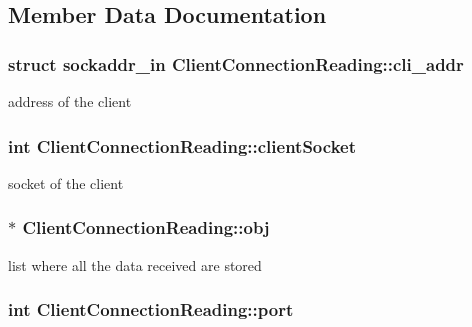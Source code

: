 \subsection{Member Data Documentation}
\hypertarget{class_client_connection_reading_a61439b4c846e3f21dd61ee25db26fdbc}{
\subsubsection[{cli\-\_\-addr}]{\setlength{\rightskip}{0pt plus 5cm}struct sockaddr\-\_\-in Client\-Connection\-Reading\-::cli\-\_\-addr\hspace{0.3cm}{\ttfamily [private]}}}\label{class_client_connection_reading_a61439b4c846e3f21dd61ee25db26fdbc}
address of the client \hypertarget{class_client_connection_reading_af973ddd8409c2bf55e4495f3d05ceea4}{
\subsubsection[{client\-Socket}]{\setlength{\rightskip}{0pt plus 5cm}int Client\-Connection\-Reading\-::client\-Socket\hspace{0.3cm}{\ttfamily [private]}}}\label{class_client_connection_reading_af973ddd8409c2bf55e4495f3d05ceea4}
socket of the client \hypertarget{class_client_connection_reading_ad160ae11dedf7b566660e6c10d48afae}{
\subsubsection[{obj}]{$\ast$ Client\-Connection\-Reading\-::obj\hspace{0.3cm}{\ttfamily [private]}}}\label{class_client_connection_reading_ad160ae11dedf7b566660e6c10d48afae}
list where all the data received are stored \hypertarget{class_client_connection_reading_a64caa03b7d63ccbb290fc50727f00a98}{
\subsubsection[{port}]{\setlength{\rightskip}{0pt plus 5cm}int Client\-Connection\-Reading\-::port\hspace{0.3cm}{\ttfamily [private]}}}\label{class_client_connection_reading_a64caa03b7d63ccbb290fc50727f00a98}
